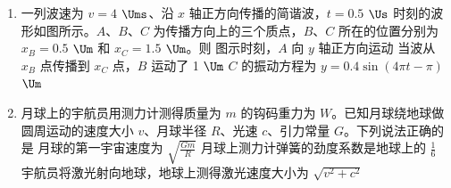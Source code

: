 \documentclass[\gkver]{gaokaozhenti}
\begin{document}
\begin{enumerate}
{A．根据 $\frac{n_{1}}{n_{2}}=\frac{U_{1}}{U_{2}}=\frac{220}{4}=\frac{55}{1}$，原、副线圈匝数比为 $55:1$，故 A 错误；

B．根据 $\frac{I_{1}}{I_{2}}=\frac{n_{2}}{n_{1}}=\frac{1}{55}$，原、副线圈电流比为 $1:55$，故 B 错误；

C．输入功率等于输出功率，$P_{1}=P_{2}=U_{2}I_{2}=4\mathrm{V}\times12.1\mathrm{A}=48.4\mathrm{W}$，故 C 错误；

D．原线圈电流 $I_{1}=\frac{P_{1}}{U_{1}}=\frac{48.4\mathrm{W}}{220\mathrm{V}}=0.22\mathrm{A}$，故 D 正确。

故选 D。
}

\item
一列波速为 $v=4$ $\Ums$、沿 $x$ 轴正方向传播的简谐波，$t=0.5$ $\Us$ 时刻的波形如图所示。$A$、$B$、$C$ 为传播方向上的三个质点，$B$、$C$ 所在的位置分别为 $x_{B}=0.5$ $\Um$ 和 $x_{C}=1.5$ $\Um$。则
{图示时刻，$A$ 向 $y$ 轴正方向运动}
{当波从 $x_{B}$ 点传播到 $x_{C}$ 点，$B$ 运动了 1 $\Um$}
{$C$ 的振动方程为 $y=0.4\sin(4\pi t-\pi)$ $\Um$}

\item
月球上的宇航员用测力计测得质量为 $m$ 的钩码重力为 $W$。已知月球绕地球做圆周运动的速度大小 $v$、月球半径 $R$、光速 $c$、引力常量 $G$。下列说法正确的是
\onepicture[w=6.20cm]{}
{月球的第一宇宙速度为 $\sqrt{\frac{Gm}{R}}$}
{月球上测力计弹簧的劲度系数是地球上的 $\frac{1}{6}$}
{宇航员将激光射向地球，地球上测得激光速度大小为 $\sqrt{v^{2}+c^{2}}$}
\end{enumerate}
\end{document}
